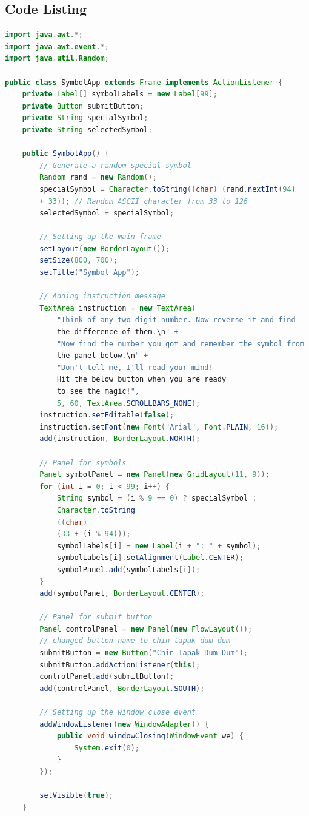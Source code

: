 \documentclass[12pt, a4paper]{article}
\begin{document}
\subsection{Code Listing}
\begin{lstlisting}[language=Java, caption=Java Swing Application Code]
import java.awt.*;
import java.awt.event.*;
import java.util.Random;

public class SymbolApp extends Frame implements ActionListener {
    private Label[] symbolLabels = new Label[99];
    private Button submitButton;
    private String specialSymbol;
    private String selectedSymbol;

    public SymbolApp() {
        // Generate a random special symbol
        Random rand = new Random();
        specialSymbol = Character.toString((char) (rand.nextInt(94)
        + 33)); // Random ASCII character from 33 to 126
        selectedSymbol = specialSymbol;

        // Setting up the main frame
        setLayout(new BorderLayout());
        setSize(800, 700);
        setTitle("Symbol App");

        // Adding instruction message
        TextArea instruction = new TextArea(
            "Think of any two digit number. Now reverse it and find
            the difference of them.\n" +
            "Now find the number you got and remember the symbol from
            the panel below.\n" +
            "Don't tell me, I'll read your mind!
            Hit the below button when you are ready
            to see the magic!",
            5, 60, TextArea.SCROLLBARS_NONE);
        instruction.setEditable(false);
        instruction.setFont(new Font("Arial", Font.PLAIN, 16));
        add(instruction, BorderLayout.NORTH);

        // Panel for symbols
        Panel symbolPanel = new Panel(new GridLayout(11, 9));
        for (int i = 0; i < 99; i++) {
            String symbol = (i % 9 == 0) ? specialSymbol : 
            Character.toString
            ((char) 
            (33 + (i % 94)));
            symbolLabels[i] = new Label(i + ": " + symbol);
            symbolLabels[i].setAlignment(Label.CENTER);
            symbolPanel.add(symbolLabels[i]);
        }
        add(symbolPanel, BorderLayout.CENTER);

        // Panel for submit button
        Panel controlPanel = new Panel(new FlowLayout());
        // changed button name to chin tapak dum dum
        submitButton = new Button("Chin Tapak Dum Dum"); 
        submitButton.addActionListener(this);
        controlPanel.add(submitButton);
        add(controlPanel, BorderLayout.SOUTH);

        // Setting up the window close event
        addWindowListener(new WindowAdapter() {
            public void windowClosing(WindowEvent we) {
                System.exit(0);
            }
        });

        setVisible(true);
    }
\end{lstlisting}
\end{document}
